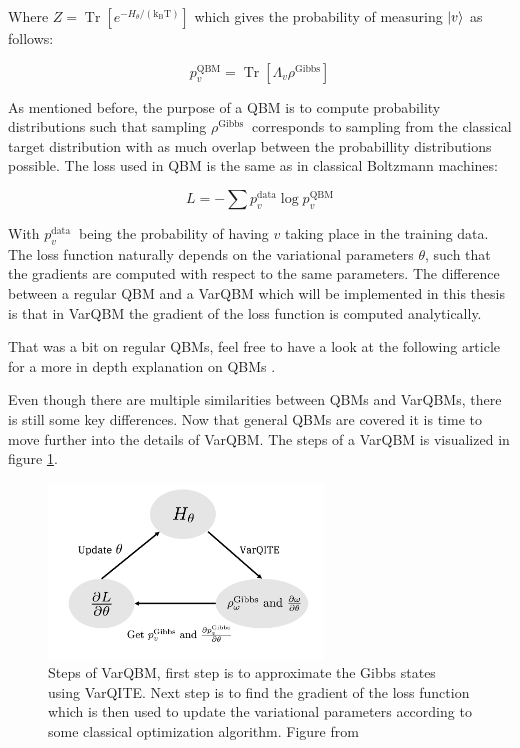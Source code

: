 \documentclass[../main.tex]{subfiles}
\begin{document}
Where $Z=\operatorname{Tr}\left[e^{-H_{\theta} /\left(\mathrm{k}_{\mathrm{B}} \mathrm{T}\right)}\right]$ which gives the probability of measuring $\ket{v}$ as follows:

\begin{equation}
p_{v}^{\mathrm{QBM}}=\operatorname{Tr}\left[\Lambda_{v} \rho^{\mathrm{Gibbs}}\right]
\end{equation}

As mentioned before, the purpose of a QBM is to compute probability distributions such that sampling $\rho^{\text {Gibbs }}$ corresponds to sampling from the classical target distribution with as much overlap between the probabillity distributions possible. The loss used in QBM is the same as in classical Boltzmann machines:

\begin{equation}
L=-\sum p_{v}^{\mathrm{data}} \log p_{v}^{\mathrm{QBM}}
\label{eq:Loss_QBM}
\end{equation}

With $p_{v}^{\text {data }}$ being the probability of having $v$ taking place in the training data. The loss function naturally depends on the variational parameters $\theta$, such that the gradients are computed with respect to the same parameters. The difference between a regular QBM and a VarQBM which will be implemented in this thesis is that in VarQBM the gradient of the loss function is computed analytically.

That was a bit on regular QBMs, feel free to have a look at the following article for a more in depth explanation on QBMs \cite{Amin_2018}. 

Even though there are multiple similarities between QBMs and VarQBMs, there is still some key differences. Now that general QBMs are covered it is time to move further into the details of VarQBM. The steps of a VarQBM is visualized in figure \ref{fig:varQBMsteps}.

\begin{figure}[h]
    \centering
    \includegraphics[width=0.65\textwidth]{figures/varqbm.png}
    \caption{Steps of VarQBM, first step is to approximate the Gibbs states using VarQITE. Next step is to find the gradient of the loss function which is then used to update the variational parameters according to some classical optimization algorithm. Figure from \cite{VQB:litteraturelist}}
    \label{fig:varQBMsteps}
\end{figure}
\end{document}
